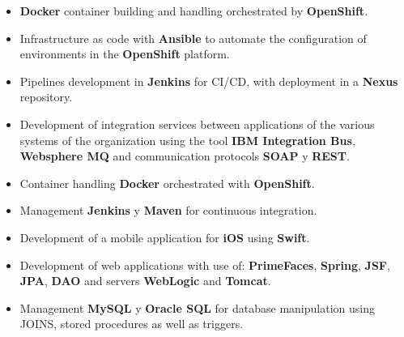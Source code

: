 \documentclass[letterpaper]{twentysecondcv} %
\begin{document}


\begin{itemize}
	\item \textbf{Docker} container building and handling orchestrated by \textbf{OpenShift}.
	\item Infrastructure as code with \textbf{Ansible} to automate the configuration of environments in the \textbf {OpenShift} platform.
	\item Pipelines development in \textbf{Jenkins} for CI/CD, with deployment in a \textbf{Nexus} repository.
\end{itemize}

\divider

\begin{itemize}
	\item Development of integration services between applications of the various systems of the organization using the tool \textbf{IBM Integration Bus}, \textbf{Websphere MQ} and communication protocols \textbf{SOAP} y \textbf{REST}.
	\item Container handling \textbf{Docker} orchestrated with \textbf{OpenShift}.
	\item Management \textbf {Jenkins} y \textbf{Maven} for continuous integration.
\end{itemize}


\newpage %

\makeprofileSecond %

\begin{itemize}
	\item Development of a mobile application for \textbf{iOS} using \textbf{Swift}.
	\item Development of web applications with use of: \textbf{PrimeFaces}, \textbf{Spring}, \textbf{JSF}, \textbf{JPA}, \textbf{DAO}  and servers \textbf{WebLogic} and \textbf{Tomcat}.
	\item Management \textbf{MySQL} y \textbf{Oracle SQL} for database manipulation using JOINS, stored procedures as well as triggers.
\end{itemize}
\end{document}
